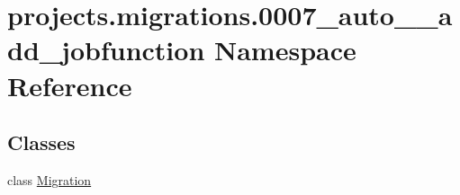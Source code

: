 \hypertarget{namespaceprojects_1_1migrations_1_10007__auto____add__jobfunction}{\section{projects.\-migrations.0007\-\_\-auto\-\_\-\-\_\-add\-\_\-jobfunction Namespace Reference}
\label{namespaceprojects_1_1migrations_1_10007__auto____add__jobfunction}
}
\subsection*{Classes}
\begin{DoxyCompactItemize}
\item 
class \hyperlink{classprojects_1_1migrations_1_10007__auto____add__jobfunction_1_1_migration}{Migration}
\end{DoxyCompactItemize}
